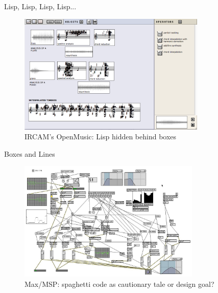 \begin{frame}{Lisp, Lisp, Lisp, Lisp...}
    \begin{figure}
    \begin{centering}
    \includegraphics[height=2.25in]{assets/include-open-music.png}
    \caption{IRCAM's OpenMusic: Lisp hidden behind boxes}
    \end{centering}
    \end{figure}
\end{frame}

\begin{frame}{Boxes and Lines}
    \begin{figure}
    \begin{centering}
    \includegraphics[height=2.25in]{assets/include-max.jpg}
    \caption{Max/MSP: spaghetti code as cautionary tale or design goal?}
    \end{centering}
    \end{figure}
\end{frame}

